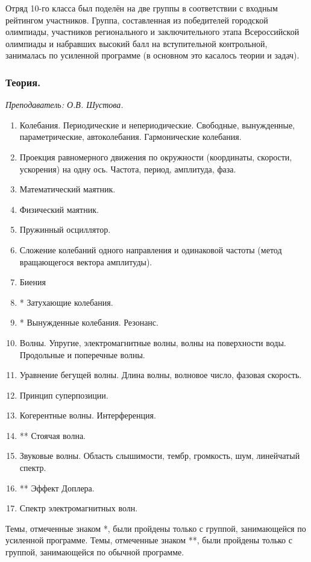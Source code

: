 \documentclass[12pt]{article}
\newlength{\h}
\newlength{\x}
\begin{document}
Отряд 10-го класса был поделён на две группы в соответствии с входным
рейтингом участников. Группа, составленная из победителей городской
олимпиады, участников регионального и заключительного этапа
Всероссийской олимпиады и набравших высокий балл на вступительной
контрольной, занималась по усиленной программе (в основном это
касалось теории и задач).

\subsubsection{Теория.}
\label{sec:daily10th}

\textit{Преподаватель: О.В. Шустова.}\\

\begin{enumerate}
\item Колебания. Периодические и непериодические. Свободные,
  вынужденные, параметрические, автоколебания. Гармонические
  колебания.
\item Проекция равномерного движения по окружности (координаты,
  скорости, ускорения) на одну ось. Частота, период, амплитуда, фаза.
\item Математический маятник.
\item Физический маятник.
\item Пружинный осциллятор.
\item Сложение колебаний одного направления и одинаковой частоты
  (метод вращающегося вектора амплитуды).
\item Биения
\item * Затухающие колебания.
\item * Вынужденные колебания. Резонанс.
\item Волны. Упругие, электромагнитные волны, волны на поверхности
  воды. Продольные и поперечные волны.
\item Уравнение бегущей волны. Длина волны, волновое число, фазовая скорость.
\item Принцип суперпозиции.
\item Когерентные волны. Интерференция.
\item ** Стоячая волна.
\item Звуковые волны. Область слышимости, тембр, громкость, шум, линейчатый спектр.
\item **  Эффект Доплера.
\item Спектр электромагнитных волн. 
\end{enumerate}

Темы, отмеченные знаком *, были пройдены только с группой,
занимающейся по усиленной программе. Темы, отмеченные знаком **, были
пройдены только с группой, занимающейся по обычной программе. 
\end{document}
